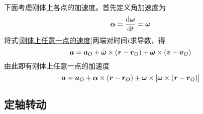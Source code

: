 下面考虑刚体上各点的加速度。首先定义{\heiti 角加速度}为
\begin{equation}
	\boldsymbol{\alpha} = \frac{\mathrm{d} \boldsymbol{\omega}}{\mathrm{d} t} = \dot{\boldsymbol{\omega}}
\end{equation}
将式\eqref{刚体上任意一点的速度}两端对时间$t$求导数，得
\begin{equation*}
	\boldsymbol{a} = \boldsymbol{a}_O + \dot{\boldsymbol{\omega}} \times (\boldsymbol{r}-\boldsymbol{r}_O) + \boldsymbol{\omega} \times (\boldsymbol{v}-\boldsymbol{v}_O)
\end{equation*}
由此即有刚体上任意一点的加速度
\begin{equation}
	\boldsymbol{a} = \boldsymbol{a}_O + \boldsymbol{\alpha} \times (\boldsymbol{r}-\boldsymbol{r}_O) + \boldsymbol{\omega} \times \left[\boldsymbol{\omega} \times (\boldsymbol{r}-\boldsymbol{r}_O)\right]
	\label{刚体上任意一点的加速度}
\end{equation}

\subsection{定轴转动}

